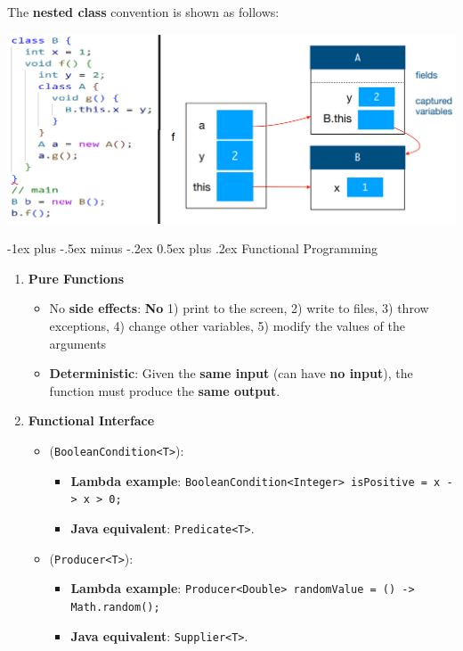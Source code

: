 \documentclass[10pt, landscape]{article}
\makeatletter
\renewcommand{\section}{\@startsection{section}{1}{0mm}%
                                {-1ex plus -.5ex minus -.2ex}%
                                {0.5ex plus .2ex}%
                                {\normalfont\large\bfseries}}
\makeatother
\begin{document}
\begin{multicols}{4}
\begin{enumerate}
    The \textbf{nested class }convention is shown as follows: \\
    \centerline{\includegraphics[width=1\linewidth]{Paper/Final/images/5.png}}
\end{enumerate}

\section{Functional Programming}
\begin{enumerate}
    \item \textbf{Pure Functions}
    \begin{itemize}
        \item No \textbf{side effects}: \textbf{No} 1) print to the screen, 2) write to files, 3) throw exceptions, 4) change other variables, 5) modify the values of the arguments
        \item \textbf{Deterministic}: Given the \textbf{same input} (can have \textbf{no input}), the function must produce the \textbf{same output}.
    \end{itemize}
    \item \textbf{Functional Interface}
    \begin{itemize}
        \item (\texttt{BooleanCondition<T>}):
        \begin{itemize}
            \item \textbf{Lambda example}: \texttt{BooleanCondition<Integer> isPositive = x -> x > 0;}
            \item \textbf{Java equivalent}: \texttt{Predicate<T>}.
        \end{itemize}
        \item (\texttt{Producer<T>}): 
        \begin{itemize}
            \item \textbf{Lambda example}: \texttt{Producer<Double> randomValue = () -> Math.random();}
            \item \textbf{Java equivalent}: \texttt{Supplier<T>}.

\end{itemize}
\end{itemize}
\end{enumerate}
\end{multicols}
\end{document}
